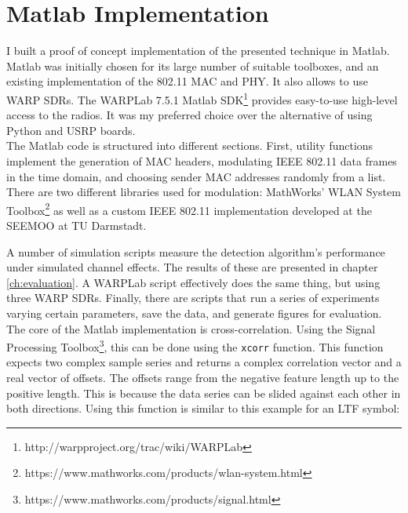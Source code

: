 
\section{Matlab Implementation}\label{sec:matlab-impl}

I built a proof of concept implementation of the presented technique in Matlab. Matlab was initially chosen for its large number of suitable toolboxes, and an existing implementation of the 802.11 MAC and PHY. It also allows to use \gls{WARP} \glspl{SDR}. The WARPLab 7.5.1 Matlab \gls{SDK}\footnote{http://warpproject.org/trac/wiki/WARPLab} provides easy-to-use high-level access to the radios. It was my preferred choice over the alternative of using Python and \gls{USRP} boards.\\

The Matlab code is structured into different sections. First, utility functions implement the generation of \gls{MAC} headers, modulating IEEE 802.11 data frames in the time domain, and choosing sender \gls{MAC} addresses randomly from a list. There are two different libraries used for modulation: MathWorks' WLAN System Toolbox\footnote{https://www.mathworks.com/products/wlan-system.html} as well as a custom IEEE 802.11 implementation developed at the \gls{SEEMOO} at TU Darmstadt.

A number of simulation scripts measure the detection algorithm's performance under simulated channel effects. The results of these are presented in chapter \ref{ch:evaluation}. A WARPLab script effectively does the same thing, but using three \gls{WARP} \glspl{SDR}. Finally, there are scripts that run a series of experiments varying certain parameters, save the data, and generate figures for evaluation.\\

The core of the Matlab implementation is cross-correlation. Using the Signal Processing Toolbox\footnote{https://www.mathworks.com/products/signal.html}, this can be done using the \texttt{xcorr} function. This function expects two complex sample series and returns a complex correlation vector and a real vector of offsets. The offsets range from the negative feature length up to the positive length. This is because the data series can be slided against each other in both directions. Using this function is similar to this example for an \gls{LTF} symbol:\\

